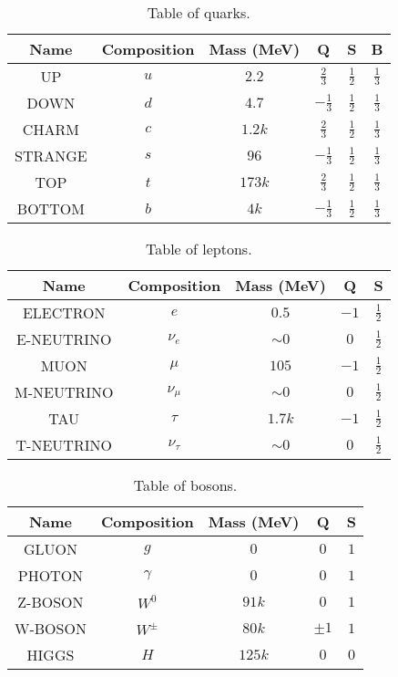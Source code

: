 \documentclass{article}
\begin{document}
\listoftables
\vspace{5pt}

\begin{table}[h!]
    \centering
    \begin{tabular}{||c c c c c c||} 
    \hline
    Name & Composition & Mass (MeV) & Q & S & B \\ [0.5ex] 
    \hline\hline
    UP & $u$ & $2.2$ & $\frac{2}{3}$ & $\frac{1}{2}$ & $\frac{1}{3}$\\[1ex] 
    DOWN & $d$ & $4.7$ & $-\frac{1}{3}$ & $\frac{1}{2}$ & $\frac{1}{3}$\\[1ex]
    CHARM & $c$ & $1.2k$ & $\frac{2}{3}$ & $\frac{1}{2}$ & $\frac{1}{3}$\\[1ex]
    STRANGE & $s$ & $96$ & $-\frac{1}{3}$ & $\frac{1}{2}$ & $\frac{1}{3}$\\[1ex]
    TOP & $t$ & $173k$ & $\frac{2}{3}$ & $\frac{1}{2}$ & $\frac{1}{3}$\\[1ex]
    BOTTOM & $b$ & $4k$ & $-\frac{1}{3}$ & $\frac{1}{2}$ & $\frac{1}{3}$\\[1ex]
    \hline
    \end{tabular}
    \caption{Table of quarks.}
    \label{table:quarks}
\end{table}

\begin{table}[h!]
    \centering
    \begin{tabular}{||c c c c c ||} 
     \hline
     Name & Composition & Mass (MeV) & Q & S \\ [0.5ex] 
     \hline\hline
     ELECTRON & $e$ & $0.5$ & $-1$ & $\frac{1}{2}$ \\[1ex] 
     E-NEUTRINO & $\nu_e$ & $\sim 0$ & $0$ & $\frac{1}{2}$ \\[1ex]
     MUON & $\mu$ & $105$ & $-1$ & $\frac{1}{2}$ \\[1ex]
     M-NEUTRINO & $\nu_\mu$ & $\sim 0$ & $0$ & $\frac{1}{2}$ \\[1ex]
     TAU & $\tau$ & $1.7k$ & $-1$ & $\frac{1}{2}$ \\[1ex]
     T-NEUTRINO & $\nu_\tau$ & $\sim 0$ & $0$ & $\frac{1}{2}$ \\[1ex]
     \hline
    \end{tabular}
    \caption{Table of leptons.}
    \label{table:leptons}
\end{table}

\begin{table}[h!]
    \centering
    \begin{tabular}{||c c c c c||} 
     \hline
     Name & Composition & Mass (MeV) & Q & S \\ [0.5ex] 
     \hline\hline
     GLUON & $g$ & $0$ & $0$ & $1$ \\[1ex] 
     PHOTON & $\gamma$ & $0$ & $0$ & $1$ \\[1ex]
     Z-BOSON & $W^0$ & $91k$ & $0$ & $1$ \\[1ex]
     W-BOSON & $W^\pm$ & $80k$ & $\pm 1$ & $1$ \\[1ex]
     HIGGS & $H$ & $125k$ & $0$ & $0$ \\[1ex]
     \hline
    \end{tabular}
    \caption{Table of bosons.}
    \label{table:bosons}
\end{table}
\end{document}
